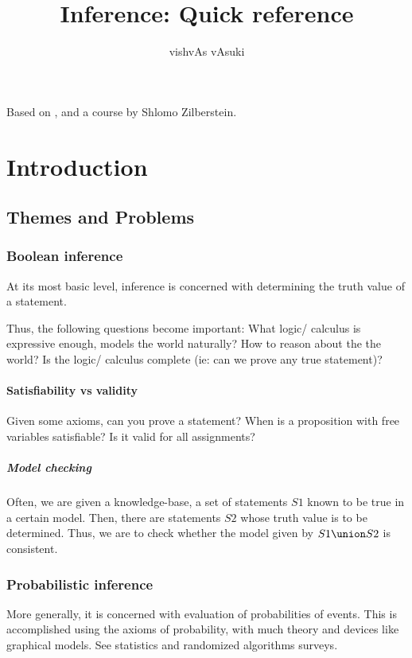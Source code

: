 \documentclass[oneside, article]{memoir}
\title{Inference: Quick reference}
\author{vishvAs vAsuki}
\begin{document}
\maketitle

Based on \cite{russellNorvig}, and a course by Shlomo Zilberstein.

\part{Introduction}
\chapter{Themes and Problems}
\section{Boolean inference}
At its most basic level, inference is concerned with determining the truth value of a statement.

Thus, the following questions become important: What logic/ calculus is expressive enough, models the world naturally? How to reason about the the world? Is the logic/ calculus complete (ie: can we prove any true statement)?

\subsection{Satisfiability vs validity}
Given some axioms, can you prove a statement? When is a proposition with free variables satisfiable? Is it valid for all assignments?

\subsubsection{Model checking}
Often, we are given a knowledge-base, a set of statements $S1$ known to be true in a certain model. Then, there are statements $S2$ whose truth value is to be determined. Thus, we are to check whether the model given by $S1 \union S2$ is consistent.



\section{Probabilistic inference}
More generally, it is concerned with evaluation of probabilities of events. This is accomplished using the axioms of probability, with much theory and devices like graphical models. See statistics and randomized algorithms surveys.
\end{document}
